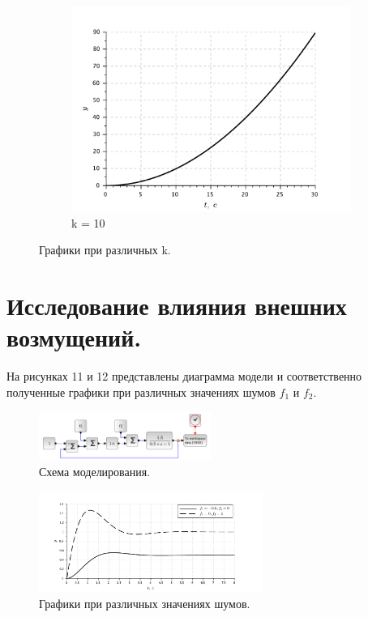\documentclass[a3paper, 11pt]{article}
\begin{document}
\begin{figure}[h!]
\begin{subfigure}{0.33\textwidth}
        \includegraphics[width = \textwidth]{images/graph2-3-K10.pdf}
        \caption{k = 10}
    \end{subfigure}
    \caption{Графики при различных k.}
\end{figure}

\newpage

\section*{Исследование влияния внешних возмущений.}
На рисунках 11 и 12 представлены диаграмма модели и соответственно полученные графики при различных значениях шумов $f_1$ и $f_2$.

\begin{figure}[h!]
    \centering
    \includegraphics[width = 0.5\textwidth]{images/model3.pdf}
    \caption{Схема моделирования.}
\end{figure}
\begin{figure}[h!]
    \centering
    \includegraphics[width = 0.65\textwidth]{images/graph3.pdf}
    \caption{Графики при различных значениях шумов.}
\end{figure}
\end{document}
